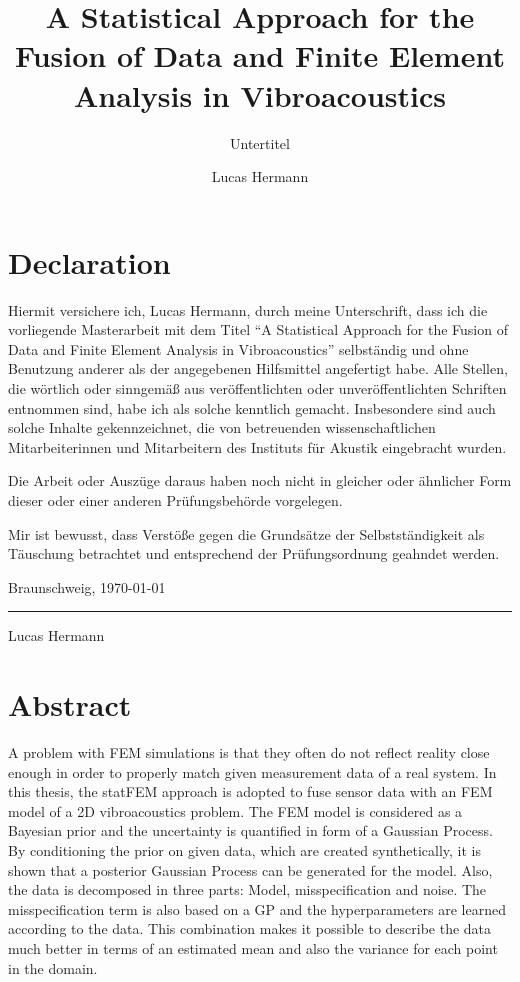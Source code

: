 \documentclass[%
  a4paper,oneside,%
  11pt,%
  smallchapters,
  style=printdev,
  extramargin,
  green,%
  rgb, <cmyk>
  ]{tubsbook}
\title{A Statistical Approach for the Fusion of Data and
Finite Element Analysis in Vibroacoustics}
\subtitle{Untertitel}
\author{Lucas Hermann}
\begin{document}


\chapter*{Declaration}
Hiermit versichere ich, Lucas Hermann, durch meine Unterschrift, dass ich die
vorliegende Masterarbeit mit dem Titel ``A Statistical Approach for the Fusion of Data and Finite Element Analysis in Vibroacoustics'' selbständig und ohne Benutzung
anderer als der angegebenen Hilfsmittel angefertigt habe. Alle Stellen, die wörtlich oder sinngemäß aus veröffentlichten oder unveröffentlichten Schriften entnommen sind, habe ich als
solche kenntlich gemacht. Insbesondere sind auch solche Inhalte gekennzeichnet, die von
betreuenden wissenschaftlichen Mitarbeiterinnen und Mitarbeitern des Instituts für Akustik eingebracht wurden.

Die Arbeit oder Auszüge daraus haben noch nicht in gleicher oder ähnlicher Form dieser
oder einer anderen Prüfungsbehörde vorgelegen.

Mir ist bewusst, dass Verstöße gegen die Grundsätze der Selbstständigkeit als Täuschung
betrachtet und entsprechend der Prüfungsordnung geahndet werden.

\begin{flushright}
Braunschweig, \today
\end{flushright}

\vspace{2cm}
\hspace{2cm}\rule{5cm}{1pt}

\hspace{2cm}\small{Lucas Hermann} 

\chapter*{Abstract}
A problem with FEM simulations is that they often do not reflect reality close enough in order to properly match given measurement data of a real system. In this thesis, the statFEM approach is adopted to fuse sensor data with an FEM model of a 2D vibroacoustics problem. The FEM model is considered as a Bayesian prior and the uncertainty is quantified in form of a Gaussian Process. By conditioning the prior on given data, which are created synthetically, it is shown that a posterior Gaussian Process can be generated for the model. Also, the data is decomposed in three parts: Model, misspecification and noise. The misspecification term is also based on a GP and the hyperparameters are learned according to the data. This combination makes it possible to describe the data much better in terms of an estimated mean and also the variance for each point in the domain. 
\end{document}
